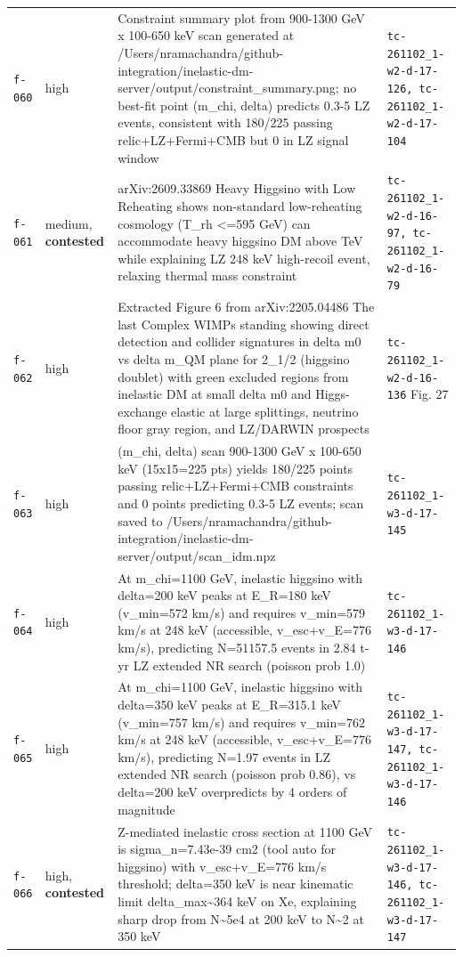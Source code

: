 \documentclass[11pt,a4paper]{article}
\begin{document}
\begin{longtable}{@{}p{}p{}p{}p{}@{}}
\texttt{f-060} & high & Constraint summary plot from 900-1300 GeV x 100-650 keV scan generated at /Users/nramachandra/github-integration/inelastic-dm-server/output/constraint\_summary.png; no best-fit point (m\_chi, delta) predicts 0.3-5 LZ events, consistent with 180/225 passing relic+LZ+Fermi+CMB but 0 in LZ signal window & \texttt{tc-261102\_\allowbreak{}1-w2-d-17-126,\allowbreak{} tc-261102\_\allowbreak{}1-w2-d-17-104} \\
\texttt{f-061} & medium, \textbf{contested} & arXiv:2609.33869 Heavy Higgsino with Low Reheating shows non-standard low-reheating cosmology (T\_rh \textless{}=595 GeV) can accommodate heavy higgsino DM above TeV while explaining LZ 248 keV high-recoil event, relaxing thermal mass constraint & \texttt{tc-261102\_\allowbreak{}1-w2-d-16-97,\allowbreak{} tc-261102\_\allowbreak{}1-w2-d-16-79} \\
\texttt{f-062} & high & Extracted Figure 6 from arXiv:2205.04486 The last Complex WIMPs standing showing direct detection and collider signatures in delta m0 vs delta m\_QM plane for 2\_1/2 (higgsino doublet) with green excluded regions from inelastic DM at small delta m0 and Higgs-exchange elastic at large splittings, neutrino floor gray region, and LZ/DARWIN prospects & \texttt{tc-261102\_\allowbreak{}1-w2-d-16-136} Fig. 27 \\
\texttt{f-063} & high & (m\_chi, delta) scan 900-1300 GeV x 100-650 keV (15x15=225 pts) yields 180/225 points passing relic+LZ+Fermi+CMB constraints and 0 points predicting 0.3-5 LZ events; scan saved to /Users/nramachandra/github-integration/inelastic-dm-server/output/scan\_idm.npz & \texttt{tc-261102\_\allowbreak{}1-w3-d-17-145} \\
\texttt{f-064} & high & At m\_chi=1100 GeV, inelastic higgsino with delta=200 keV peaks at E\_R=180 keV (v\_min=572 km/s) and requires v\_min=579 km/s at 248 keV (accessible, v\_esc+v\_E=776 km/s), predicting N=51157.5 events in 2.84 t-yr LZ extended NR search (poisson prob 1.0) & \texttt{tc-261102\_\allowbreak{}1-w3-d-17-146} \\
\texttt{f-065} & high & At m\_chi=1100 GeV, inelastic higgsino with delta=350 keV peaks at E\_R=315.1 keV (v\_min=757 km/s) and requires v\_min=762 km/s at 248 keV (accessible, v\_esc+v\_E=776 km/s), predicting N=1.97 events in LZ extended NR search (poisson prob 0.86), vs delta=200 keV overpredicts by 4 orders of magnitude & \texttt{tc-261102\_\allowbreak{}1-w3-d-17-147,\allowbreak{} tc-261102\_\allowbreak{}1-w3-d-17-146} \\
\texttt{f-066} & high, \textbf{contested} & Z-mediated inelastic cross section at 1100 GeV is sigma\_n=7.43e-39 cm2 (tool auto for higgsino) with v\_esc+v\_E=776 km/s threshold; delta=350 keV is near kinematic limit delta\_max\textasciitilde{}364 keV on Xe, explaining sharp drop from N\textasciitilde{}5e4 at 200 keV to N\textasciitilde{}2 at 350 keV & \texttt{tc-261102\_\allowbreak{}1-w3-d-17-146,\allowbreak{} tc-261102\_\allowbreak{}1-w3-d-17-147} \\

\end{longtable}
\end{document}
